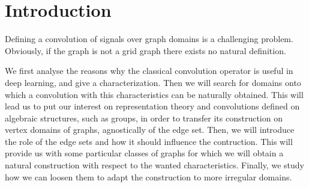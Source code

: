 \section*{Introduction}

Defining a convolution of signals over graph domains is a challenging problem. Obviously, if the graph is not a grid graph there exists no natural definition.

We first analyse the reasons why the classical convolution operator is useful in deep learning, and give a characterization. Then we will search for domains onto which a convolution with this characteristics can be naturally obtained. This will lead us to put our interest on representation theory and convolutions defined on algebraic structures, such as groups, in order to transfer its construction on vertex domains of graphs, agnostically of the edge set. Then, we will introduce the role of the edge sets and how it should influence the contruction. This will provide us with some particular classes of graphs for which we will obtain a natural construction with respect to the wanted characteristics. Finally, we study how we can loosen them to adapt the construction to more irregular domains.